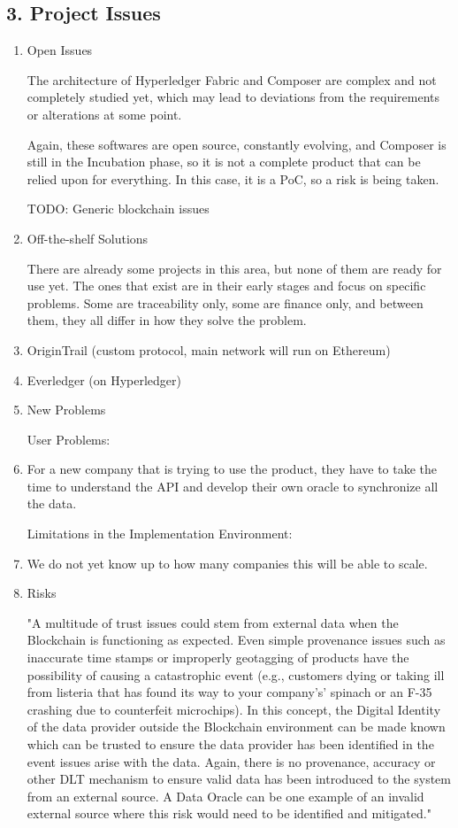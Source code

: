 \subsection*{3. Project Issues}
\begin{enumerate}
	\item Open Issues
		\par The architecture of Hyperledger Fabric and Composer are complex and not completely studied yet, which may lead to deviations from the requirements or alterations at some point.
		\par Again, these softwares are open source, constantly evolving, and Composer is still in the Incubation phase, so it is not a complete product that can be relied upon for everything. In this 
		case, it is a PoC, so a risk is being taken.
		\par TODO: Generic blockchain issues
	
    \item Off-the-shelf Solutions
		\par There are already some projects in this area, but none of them are ready for use yet. The ones that exist are in their early stages and focus on specific problems. Some are traceability only, some are finance only, and between them, they all differ in how they solve the problem.
			\item OriginTrail (custom protocol, main network will run on Ethereum)
			\item Everledger (on Hyperledger)
			
    \item New Problems
		\par User Problems: 
			\item For a new company that is trying to use the product, they have to take the time to understand the API and develop their own oracle to synchronize all the data. 
		\par Limitations in the Implementation Environment:
			\item We do not yet know up to how many companies this will be able to scale.
		
    \item Risks
		\par "A multitude of trust issues could stem from external data when the Blockchain is functioning as expected. Even simple provenance issues such as inaccurate time stamps or improperly geotagging of products have the possibility of causing a catastrophic event (e.g., customers dying or taking ill from listeria that has found its way to your company's’ spinach or an F-35 crashing due to counterfeit microchips). In this concept, the Digital Identity of the data provider outside the Blockchain environment can be made known which can be trusted to ensure the data provider has been identified in the event issues arise with the data. Again, there is no provenance, accuracy or other DLT mechanism to ensure valid data has been introduced to the system from an external source. A Data Oracle can be one example of an invalid external source where this risk would need to be identified and mitigated."
		

\end{enumerate}
